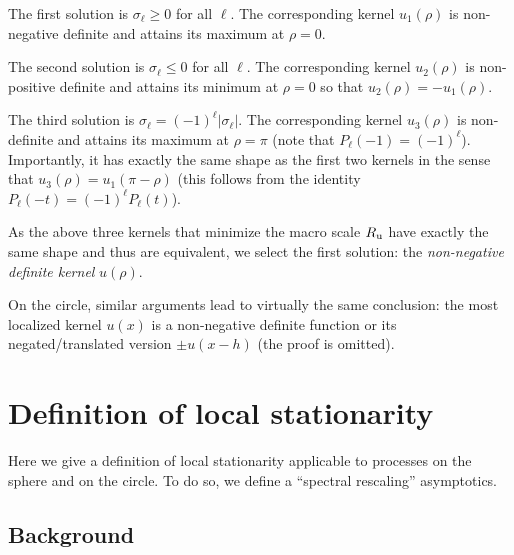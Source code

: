 \documentclass[12pt]{article}
\begin{document}
The first solution is  $\sigma_\ell \ge 0$ for all $\ell$. The corresponding kernel
$u_1(\rho)$ is non-negative definite and attains its maximum at $\rho=0$.

The second solution is  $\sigma_\ell \le 0$ for all $\ell$. The corresponding kernel $u_2(\rho)$
is non-positive definite and
 attains its minimum  at $\rho=0$ so that $u_2(\rho) = -u_1(\rho)$.

The third solution is $\sigma_\ell = (-1)^\ell |\sigma_\ell|$. The corresponding kernel $u_3(\rho)$
is non-definite and
 attains its maximum  at $\rho=\pi$ (note that $P_\ell(-1)=(-1)^\ell$). 
 Importantly, it has exactly the same shape
as the first two kernels in the sense that $u_3(\rho) = u_1(\pi-\rho)$
(this follows from the identity $P_\ell(-t)=(-1)^\ell P_\ell(t)$).

As the above three kernels that minimize the macro scale $R_{\rm u}$ have exactly the same shape
and thus are  equivalent, we select
the first solution: the {\em non-negative definite kernel} $u(\rho)$.

On the circle, similar arguments lead to virtually the same conclusion:
the most localized kernel $u(x)$ is a non-negative definite function or its negated/translated version
$\pm u(x-h)$ (the proof is omitted).





\section{Definition of local stationarity}
\label{App_locStatio} 




Here we give a definition of local stationarity
applicable to processes on the sphere  and on the circle.
To do so, we define a ``spectral rescaling'' asymptotics.



\subsection {Background}
\label{sec_LSM_locsta_overview}
\end{document}
